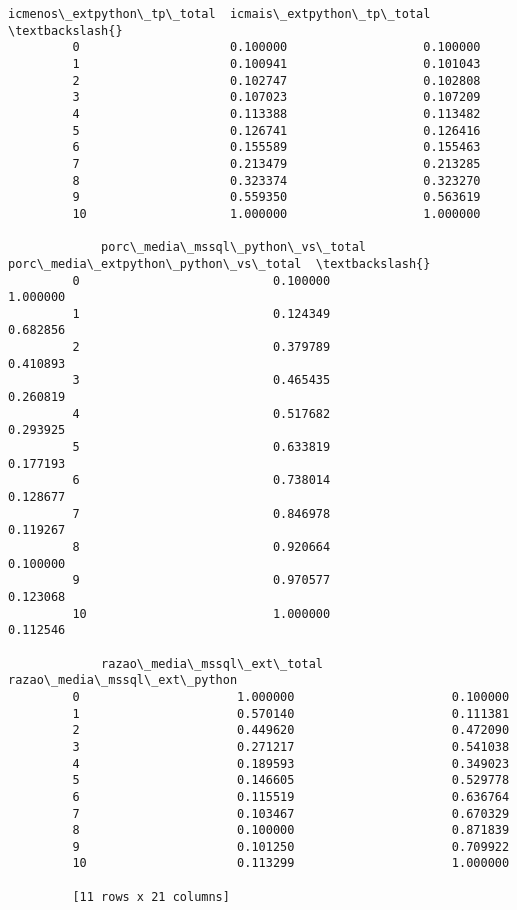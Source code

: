 \documentclass[11pt]{article}
\begin{document}
\begin{Verbatim}[commandchars=\\\{\}]
             icmenos\_extpython\_tp\_total  icmais\_extpython\_tp\_total  \textbackslash{}
         0                     0.100000                   0.100000   
         1                     0.100941                   0.101043   
         2                     0.102747                   0.102808   
         3                     0.107023                   0.107209   
         4                     0.113388                   0.113482   
         5                     0.126741                   0.126416   
         6                     0.155589                   0.155463   
         7                     0.213479                   0.213285   
         8                     0.323374                   0.323270   
         9                     0.559350                   0.563619   
         10                    1.000000                   1.000000   
         
             porc\_media\_mssql\_python\_vs\_total  porc\_media\_extpython\_python\_vs\_total  \textbackslash{}
         0                           0.100000                              1.000000   
         1                           0.124349                              0.682856   
         2                           0.379789                              0.410893   
         3                           0.465435                              0.260819   
         4                           0.517682                              0.293925   
         5                           0.633819                              0.177193   
         6                           0.738014                              0.128677   
         7                           0.846978                              0.119267   
         8                           0.920664                              0.100000   
         9                           0.970577                              0.123068   
         10                          1.000000                              0.112546   
         
             razao\_media\_mssql\_ext\_total  razao\_media\_mssql\_ext\_python  
         0                      1.000000                      0.100000  
         1                      0.570140                      0.111381  
         2                      0.449620                      0.472090  
         3                      0.271217                      0.541038  
         4                      0.189593                      0.349023  
         5                      0.146605                      0.529778  
         6                      0.115519                      0.636764  
         7                      0.103467                      0.670329  
         8                      0.100000                      0.871839  
         9                      0.101250                      0.709922  
         10                     0.113299                      1.000000  
         
         [11 rows x 21 columns]
\end{Verbatim}
            
\end{document}

